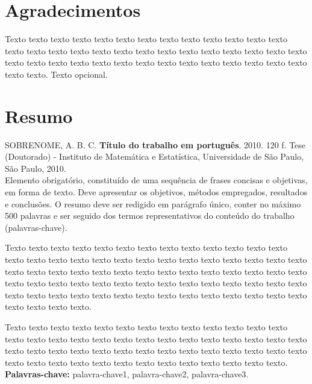 \chapter*{Agradecimentos}

Texto texto texto texto texto texto texto texto texto texto texto texto texto
texto texto texto texto texto texto texto texto texto texto texto texto texto
texto texto texto texto texto texto texto texto texto texto texto texto texto
texto texto texto texto. Texto opcional.

\chapter*{Resumo}

\noindent%
SOBRENOME, A. B. C. \textbf{Título do trabalho em português}. 2010. 120 f. Tese
(Doutorado) - Instituto de Matemática e Estatística, Universidade de São Paulo,
São Paulo, 2010.
\\

Elemento obrigatório, constituído de uma sequência de frases concisas e
objetivas, em forma de texto.  Deve apresentar os objetivos, métodos empregados,
resultados e conclusões.  O resumo deve ser redigido em parágrafo único, conter
no máximo 500 palavras e ser seguido dos termos representativos do conteúdo do
trabalho (palavras-chave).

Texto texto texto texto texto texto texto texto texto texto texto texto texto
texto texto texto texto texto texto texto texto texto texto texto texto texto
texto texto texto texto texto texto texto texto texto texto texto texto texto
texto texto texto texto texto texto texto texto texto texto texto texto texto
texto texto texto texto texto texto texto texto texto texto texto texto texto
texto texto texto texto texto texto texto texto.

Texto texto texto texto texto texto texto texto texto texto texto texto texto
texto texto texto texto texto texto texto texto texto texto texto texto texto
texto texto texto texto texto texto texto texto texto texto texto texto texto
texto texto texto texto texto texto texto texto texto texto texto texto texto
texto texto.
\\

\noindent%
\textbf{Palavras-chave:} palavra-chave1, palavra-chave2, palavra-chave3.
